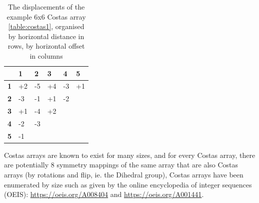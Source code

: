 \documentclass[
10pt, %
a4paper, %
oneside, %
headinclude,footinclude, %
BCOR5mm, %
]{scrartcl}
\begin{document}
\begin{table}[h]
\centering
\begin{tabular}{l|l|llll}
\cline{2-6}
                                 & \textbf{1} & \multicolumn{1}{l|}{\textbf{2}} & \multicolumn{1}{l|}{\textbf{3}} & \multicolumn{1}{l|}{\textbf{4}} & \multicolumn{1}{l|}{\textbf{5}} \\ \hline
\multicolumn{1}{|l|}{\textbf{1}} & +2         & \multicolumn{1}{l|}{-5}         & \multicolumn{1}{l|}{+4}         & \multicolumn{1}{l|}{-3}         & \multicolumn{1}{l|}{+1}         \\ \hline
\multicolumn{1}{|l|}{\textbf{2}} & -3         & \multicolumn{1}{l|}{-1}         & \multicolumn{1}{l|}{+1}         & \multicolumn{1}{l|}{-2}         &                                 \\ \cline{1-5}
\multicolumn{1}{|l|}{\textbf{3}} & +1         & \multicolumn{1}{l|}{-4}         & \multicolumn{1}{l|}{+2}         &                                 &                                 \\ \cline{1-4}
\multicolumn{1}{|l|}{\textbf{4}} & -2         & \multicolumn{1}{l|}{-3}         &                                 &                                 &                                 \\ \cline{1-3}
\multicolumn{1}{|l|}{\textbf{5}} & -1         &                                 &                                 &                                 &                                 \\ \cline{1-2}
\end{tabular}
\caption{The displacements of the example 6x6 Costas array \ref{table:costas1}, organised by horizontal distance in rows, by horizontal offset in columns}\label{table:costas2}
\end{table}

Costas arrays are known to exist for many sizes, and for every Costas array, there are potentially 8 symmetry mappings of the same array that are also Costas arrays (by rotations and flip, ie. the Dihedral group), Costas arrays have been enumerated by size such as given by the online encyclopedia of integer sequences (OEIS): \url{https://oeis.org/A008404} and \url{https://oeis.org/A001441}.
\end{document}
